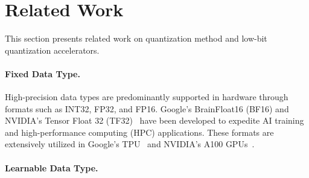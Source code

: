 \vspace*{0.2cm}
\section{Related Work}

This section presents related work on quantization method and low-bit quantization accelerators.


\paragraph{Fixed Data Type.} 

High-precision data types are predominantly supported in hardware through formats such as INT32, FP32, and FP16.
Google's BrainFloat16 (BF16) and NVIDIA's Tensor Float 32 (TF32)~\cite{micikevicius2018mixed} have been developed to expedite AI training and high-performance computing (HPC) applications. These formats are extensively utilized in Google's TPU~\cite{jouppi2023tpu} and NVIDIA's A100 GPUs~\cite{a100}.



\paragraph{Learnable Data Type.}



